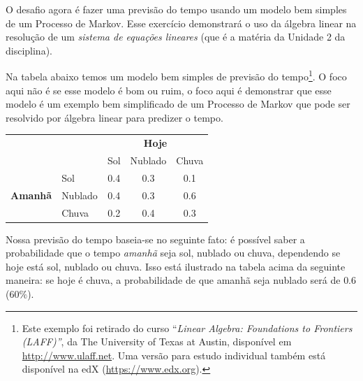 \documentclass[pdftex, brazil, 12pt, oneside, addpoints]{exam}
\newcommand{\ingles}[1]{\textit{#1}}
\begin{document}
\newpage

O desafio agora é fazer uma previsão do tempo usando
um modelo bem simples de um Processo de Markov. Esse exercício
demonstrará o uso da álgebra linear na
resolução de um \emph{sistema de equações lineares} (que é a matéria da
Unidade 2 da disciplina).

Na tabela abaixo temos um modelo bem simples de previsão do
tempo\footnote{Este exemplo foi retirado do curso ``\ingles{Linear
    Algebra: Foundations to Frontiers (LAFF)''}, da The University of
  Texas at Austin, disponível em \url{http://www.ulaff.net}. Uma
  versão para estudo individual também está disponível na edX (\url{https://www.edx.org}).}.
O foco aqui não é se esse modelo é bom ou ruim, o foco aqui é demonstrar
que esse modelo é um exemplo bem simplificado de um Processo de Markov
que pode ser resolvido por álgebra linear para predizer o tempo.

\begin{table}[H]
  \centering
\begin{tabular}{cl|c|c|c|}
\cline{3-5}
\multicolumn{1}{l}{}                                   &         & \multicolumn{3}{c|}{\textbf{Hoje}} \\ \cline{3-5} 
\multicolumn{1}{l}{}                                   &         & Sol      & Nublado     & Chuva     \\ \hline
\multicolumn{1}{|c|}{\multirow{3}{*}{\textbf{Amanhã}}} & Sol     & 0.4      & 0.3         & 0.1       \\ \cline{2-5} 
\multicolumn{1}{|c|}{}                                 & Nublado & 0.4      & 0.3         & 0.6       \\ \cline{2-5} 
\multicolumn{1}{|c|}{}                                 & Chuva   & 0.2      & 0.4         & 0.3       \\ \hline
\end{tabular}
\end{table}

Nossa previsão do tempo baseia-se no seguinte fato: é possível saber a
probabilidade que o tempo \emph{amanhã} seja sol, nublado ou chuva,
dependendo se hoje está sol, nublado ou chuva. Isso está ilustrado na
tabela acima da seguinte maneira: se hoje é chuva, a probabilidade de
que amanhã seja nublado será de $0.6$ ($60\%$).
\end{document}
